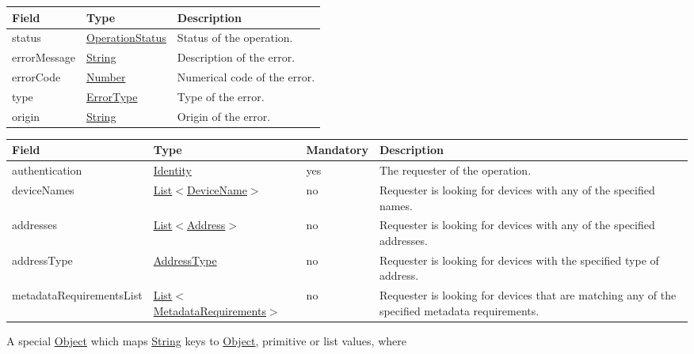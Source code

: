 \documentclass[a4paper]{arrowhead}
\newcommand{\pref}[1]{{\textcolor{ArrowheadGrey}{\hyperref[sec:model:primitives:#1]{#1}}}}
\begin{document}
\begin{table}[ht!]
\begin{tabularx}{\textwidth}{| p{4.25cm} | p{3.5cm} | X |} \hline
\rowcolor{gray!33} Field & Type      & Description \\ \hline
status & \pref{OperationStatus} & Status of the operation. \\ \hline
errorMessage & \pref{String} & Description of the error. \\ \hline
errorCode &\pref{Number}  & Numerical code of the error. \\ \hline
type & \pref{ErrorType} & Type of the error. \\ \hline
origin & \pref{String} & Origin of the error. \\ \hline
\end{tabularx}
\end{table}


\begin{table}[ht!]
\begin{tabularx}{\textwidth}{| p{4.2cm} | p{4.8cm} | p{2cm} | X |} \hline
\rowcolor{gray!33} Field & Type & Mandatory & Description \\ \hline
authentication & \hyperref[sec:model:Identity]{Identity} & yes & The requester of the operation. \\ \hline
deviceNames &  \pref{List}$<$\pref{DeviceName}$>$ & no & Requester is looking for devices with any of the specified names. \\ \hline
addresses &  \pref{List}$<$\pref{Address}$>$ & no & Requester is looking for devices with any of the specified add\-resses.   \\ \hline
addressType &  \pref{AddressType} & no & Requester is looking for devices with the specified type of address. \\ \hline
metadataRequirementsList & \pref{List}$<$\hyperref[sec:model:MetadataRequirements]{MetadataRequirements}$>$ & no & Requester is looking for devices that are matching any of the spe\-cified metadata requirements. \\ \hline
\end{tabularx}
\end{table}


A special \pref{Object} which maps \pref{String} keys to \pref{Object}, primitive or list values, where 
\end{document}
